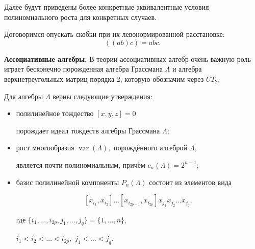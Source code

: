 Далее будут приведены более конкретные эквивалентные условия полиномиального роста для конкретных случаев.



Договоримся опускать скобки при их левонормированной расстановке: $$((ab)c) = abc.$$






\smallskip



{\bf Ассоциативные алгебры.} В теории ассоциативных алгебр очень важную роль играет бесконечно порожденная алгебра Грассмана $\Lambda$ и алгебра верхнетреугольных матриц порядка 2, которую обозначим через $UT_2$.



\vskip 0.1in



\begin{theorem}

Для алгебры $\Lambda$ верны следующие утверждения\/{\rm:}



\begin{itemize}

\item[\rm (i)] полилинейное тождество $ [x,y,z]=0$

порождает идеал тождеств алгебры Грассмана $\Lambda;$



\item[\rm (ii)] рост многообразия $\mathop{var}(\Lambda),$ порождённого алгеброй $\Lambda,$

является почти полиномиальным, причём $c_n(\Lambda)=2^{n-1};$



\item[\rm (iii)] базис полилинейной компоненты $P_n(\Lambda)$ состоит из элементов вида

$$

 [x_{i_1},x_{i_2}] \dots 

[x_{i_{2p-1}},x_{i_{2p}}] x_{j_1} x_{j_2} \dots  x_{j_q},

$$

где $\{i_1, \dots ,i_{2p},j_1, \dots ,j_q\}=\{1, \dots ,n\},$

$i_1<i_2< \dots <i_{2p},$ $j_1< \dots <j_q.$



\end{itemize}



\end{theorem}



